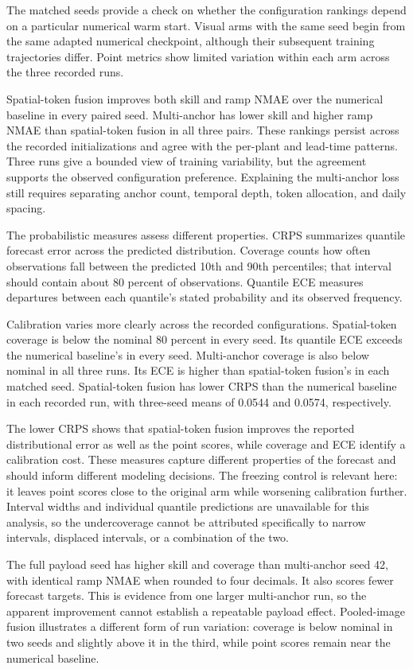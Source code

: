 The matched seeds provide a check on whether the configuration rankings depend on a particular numerical warm start. Visual arms with the same seed begin from the same adapted numerical checkpoint, although their subsequent training trajectories differ. Point metrics show limited variation within each arm across the three recorded runs.

Spatial-token fusion improves both skill and ramp NMAE over the numerical baseline in every paired seed. Multi-anchor has lower skill and higher ramp NMAE than spatial-token fusion in all three pairs. These rankings persist across the recorded initializations and agree with the per-plant and lead-time patterns. Three runs give a bounded view of training variability, but the agreement supports the observed configuration preference. Explaining the multi-anchor loss still requires separating anchor count, temporal depth, token allocation, and daily spacing.

The probabilistic measures assess different properties. CRPS summarizes quantile forecast error across the predicted distribution. Coverage counts how often observations fall between the predicted 10th and 90th percentiles; that interval should contain about 80 percent of observations. Quantile ECE measures departures between each quantile's stated probability and its observed frequency.

Calibration varies more clearly across the recorded configurations. Spatial-token coverage is below the nominal 80 percent in every seed. Its quantile ECE exceeds the numerical baseline's in every seed. Multi-anchor coverage is also below nominal in all three runs. Its ECE is higher than spatial-token fusion's in each matched seed. Spatial-token fusion has lower CRPS than the numerical baseline in each recorded run, with three-seed means of 0.0544 and 0.0574, respectively.

The lower CRPS shows that spatial-token fusion improves the reported distributional error as well as the point scores, while coverage and ECE identify a calibration cost. These measures capture different properties of the forecast and should inform different modeling decisions. The freezing control is relevant here: it leaves point scores close to the original arm while worsening calibration further. Interval widths and individual quantile predictions are unavailable for this analysis, so the undercoverage cannot be attributed specifically to narrow intervals, displaced intervals, or a combination of the two.

The full payload seed has higher skill and coverage than multi-anchor seed 42, with identical ramp NMAE when rounded to four decimals. It also scores fewer forecast targets. This is evidence from one larger multi-anchor run, so the apparent improvement cannot establish a repeatable payload effect. Pooled-image fusion illustrates a different form of run variation: coverage is below nominal in two seeds and slightly above it in the third, while point scores remain near the numerical baseline.

